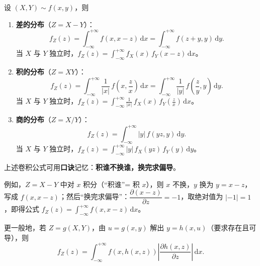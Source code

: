 ﻿\documentclass[lang=cn,11pt]{elegantbook}
\begin{document}
\begin{property}[差、积、商的分布]\label{prop:diff-prod-quot-dist}
设 $(X,Y) \sim f(x,y)$，则
\begin{enumerate}
    \item \textbf{差的分布}（$Z = X - Y$）：
    \[
    f_Z(z) = \int_{-\infty}^{+\infty}f(x, x-z)\,\mathrm{d}x = \int_{-\infty}^{+\infty}f(z+y, y)\,\mathrm{d}y.
    \]
    当 $X$ 与 $Y$ 独立时，$f_Z(z) = \displaystyle\int_{-\infty}^{+\infty}f_X(x)\,f_Y(x-z)\,\mathrm{d}x$。

    \item \textbf{积的分布}（$Z = XY$）：
    \[
    f_Z(z) = \int_{-\infty}^{+\infty}\frac{1}{|x|}\,f\!\left(x, \frac{z}{x}\right)\,\mathrm{d}x = \int_{-\infty}^{+\infty}\frac{1}{|y|}\,f\!\left(\frac{z}{y}, y\right)\,\mathrm{d}y.
    \]
    当 $X$ 与 $Y$ 独立时，$f_Z(z) = \displaystyle\int_{-\infty}^{+\infty}\frac{1}{|x|}\,f_X(x)\,f_Y\!\left(\frac{z}{x}\right)\,\mathrm{d}x$。

    \item \textbf{商的分布}（$Z = X / Y$）：
    \[
    f_Z(z) = \int_{-\infty}^{+\infty}|y|\,f(yz, y)\,\mathrm{d}y.
    \]
    当 $X$ 与 $Y$ 独立时，$f_Z(z) = \displaystyle\int_{-\infty}^{+\infty}|y|\,f_X(yz)\,f_Y(y)\,\mathrm{d}y$。
\end{enumerate}
\end{property}

\begin{note}
上述卷积公式可用\textbf{口诀}记忆：\textbf{积谁不换谁，换完求偏导}。

例如，$Z = X - Y$ 中对 $x$ 积分（``积谁''= 积 $x$），则 $x$ 不换，$y$ 换为 $y = x - z$，写成 $f(x, x-z)$；然后``换完求偏导''：$\dfrac{\partial(x-z)}{\partial z} = -1$，取绝对值为 $|-1| = 1$，即得公式 $f_Z(z) = \displaystyle\int_{-\infty}^{+\infty}f(x, x-z)\,\mathrm{d}x$。

更一般地，若 $Z = g(X,Y)$，由 $u = g(x,y)$ 解出 $y = h(x,u)$（要求存在且可导），则
\[
f_Z(z) = \int_{-\infty}^{+\infty}f(x, h(x,z))\left|\frac{\partial h(x,z)}{\partial z}\right|\,\mathrm{d}x.
\]
\end{note}
\end{document}
